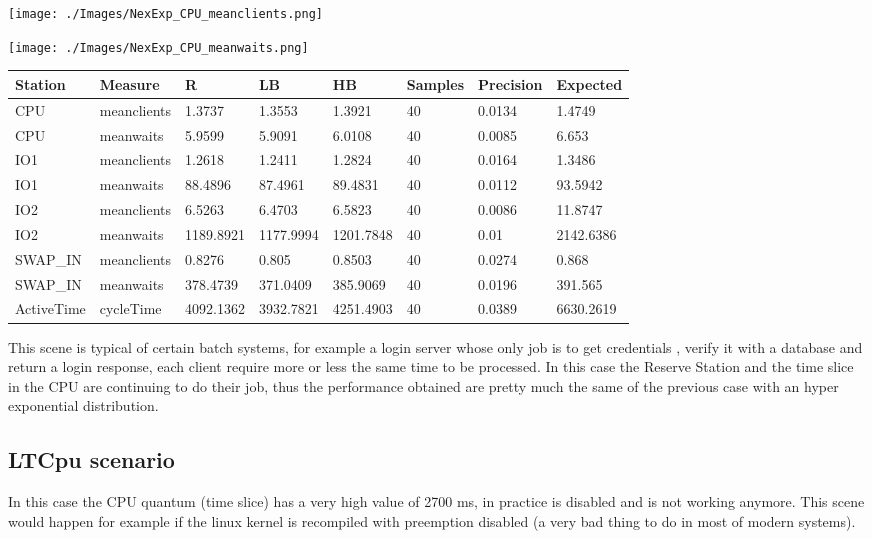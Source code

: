 \documentclass[12pt,a4paper]{article}
\begin{document}
\texttt{[image: ./Images/NexExp\_CPU\_meanclients.png]}

\texttt{[image: ./Images/NexExp\_CPU\_meanwaits.png]}


\begin{table}[!ht]
    \centering
    \begin{tabular}{|l|l|l|l|l|l|l|l|}
    \hline
    Station & Measure & R & LB & HB & Samples & Precision & Expected \\ \hline
    CPU & meanclients & 1.3737 & 1.3553 & 1.3921 & 40 & 0.0134 & 1.4749 \\ \hline
    CPU & meanwaits & 5.9599 & 5.9091 & 6.0108 & 40 & 0.0085 & 6.653 \\ \hline
    IO1 & meanclients & 1.2618 & 1.2411 & 1.2824 & 40 & 0.0164 & 1.3486 \\ \hline
    IO1 & meanwaits & 88.4896 & 87.4961 & 89.4831 & 40 & 0.0112 & 93.5942 \\ \hline
    IO2 & meanclients & 6.5263 & 6.4703 & 6.5823 & 40 & 0.0086 & 11.8747 \\ \hline
    IO2 & meanwaits & 1189.8921 & 1177.9994 & 1201.7848 & 40 & 0.01 & 2142.6386 \\ \hline
    SWAP\_IN & meanclients & 0.8276 & 0.805 & 0.8503 & 40 & 0.0274 & 0.868 \\ \hline
    SWAP\_IN & meanwaits & 378.4739 & 371.0409 & 385.9069 & 40 & 0.0196 & 391.565 \\ \hline
    ActiveTime & cycleTime & 4092.1362 & 3932.7821 & 4251.4903 & 40 & 0.0389 & 6630.2619 \\ \hline
    \end{tabular}
\end{table}

This scene is typical of certain batch systems, for example a login server whose only job is to get credentials , verify it with a database and return a login response, each client require more or less the same time to be processed. In this case the Reserve Station and the time slice in the CPU are continuing to do their job, thus the performance obtained are pretty much the same of the previous case with an hyper exponential distribution.


\subsection{LTCpu scenario}

In this case the CPU quantum (time slice) has a very high value of 2700 ms, in practice is disabled and is not working anymore. This scene would happen for example if the linux kernel is recompiled with preemption disabled (a very bad thing to do in most of modern systems).
\\
\end{document}
